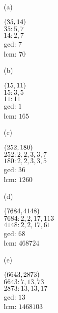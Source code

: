 \begin{mdframed}[style=darkAnswer,frametitle={Joe Starr}]
  \begin{multicols}{2}
    \begin{itemize}
      \item [(a)] {
            \begin{multicols}{2}
              $\left(35,14\right)$\\
              $35: 5,7$ \\
              $14: 2,7$ \\
              gcd: $7$ \\
              lcm: $70$
            \end{multicols}
            }
      \item [(b)] {
            \begin{multicols}{2}
              $\left(15,11\right)$ \\
              $15: 3,5$ \\
              $11: 11$ \\
              gcd: $1$ \\
              lcm: $165$
            \end{multicols}
            }
      \item [(c)] {
            \begin{multicols}{2}
              $\left(252,180\right)$ \\
              $252: 2,2,3,3,7$ \\
              $180: 2,2,3,3,5$ \\
              gcd: $36$ \\
              lcm: $1260$
            \end{multicols}
            }
      \item [(d)] {
            \begin{multicols}{2}
              $\left(7684,4148\right)$ \\
              $7684: 2,2,17,113$ \\
              $4148: 2,2,17,61$ \\
              gcd: $68$ \\
              lcm: $468724$
            \end{multicols}
            }
      \item [(e)] {
            \begin{multicols}{2}
              $\left(6643,2873\right)$ \\
              $6643: 7,13,73$ \\
              $2873: 13,13,17$ \\
              gcd: $13$ \\
              lcm: $1468103$
            \end{multicols}
            }
    \end{itemize}
  \end{multicols}
\end{mdframed}
